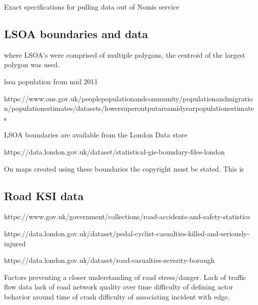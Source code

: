 \documentclass[11pt]{article} %
\begin{document}
Exact specifications for pulling data out of Nomis service


\subsection{LSOA boundaries and data}


where LSOA's were comprised of multiple polygons, the centroid of the largest polygon was used. 

lsoa population from mid 2011 

https://www.ons.gov.uk/peoplepopulationandcommunity/populationandmigration/populationestimates/datasets/lowersuperoutputareamidyearpopulationestimates

LSOA boundaries are available from the London Data store



https://data.london.gov.uk/dataset/statistical-gis-boundary-files-london

On maps created using these boundaries the copyright must be stated. This is

\subsection{Road KSI data}

https://www.gov.uk/government/collections/road-accidents-and-safety-statistics

https://data.london.gov.uk/dataset/pedal-cyclist-casualties-killed-and-seriously-injured

https://data.london.gov.uk/dataset/road-casualties-severity-borough


Factors preventing a closer understanding of road stress/danger. 
	Lack of traffic flow data
	lack of road network quality over time
	difficulty of defining actor behavior around time of crash
	difficulty of associating incident with edge.  


\end{document}
